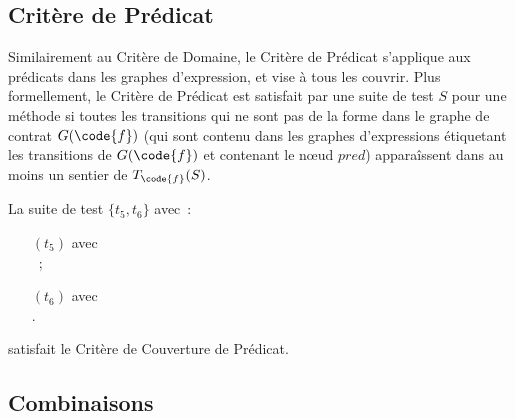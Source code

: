 \subsection{Critère de Prédicat}

Similairement au Critère de Domaine, le Critère de Prédicat s'applique aux
prédicats dans les graphes d'expression, et vise à tous les couvrir. Plus
formellement, le Critère de Prédicat est satisfait par une suite de test $S$
pour une méthode  si toutes les transitions qui ne sont pas de la forme
 dans le graphe de contrat $G(\code{f})$ (qui sont contenu dans
les graphes d'expressions étiquetant les transitions de $G(\code{f})$ et
contenant le nœud $\mathit{pred}$) apparaîssent dans au moins un sentier de
$T_\code{f}(S)$.

\begin{example}

La suite de test $\{t_5, t_6\}$ avec~:
%
\begin{itemize}

\item[$(t_5)$]  avec \\
~;

\item[$(t_6)$]  avec \\
.

\end{itemize}
%
satisfait le Critère de Couverture de Prédicat.

\end{example}

\subsection{Combinaisons}

